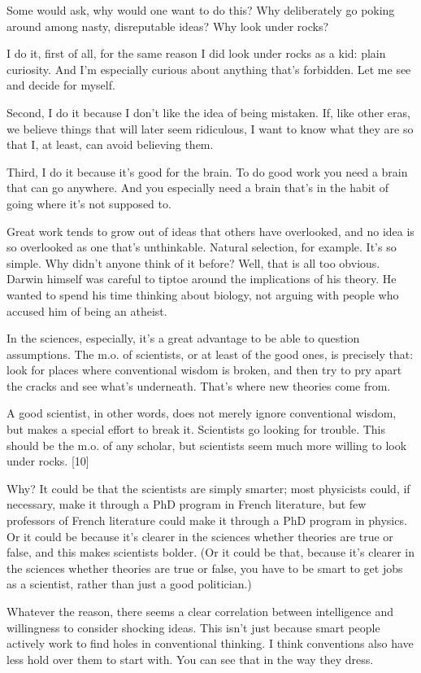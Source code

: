 Some would ask, why would one want to do this? Why deliberately go
poking around among nasty, disreputable ideas? Why look under rocks?

I do it, first of all, for the same reason I did look under rocks as a
kid: plain curiosity. And I'm especially curious about anything that's
forbidden. Let me see and decide for myself.

Second, I do it because I don't like the idea of being mistaken. If,
like other eras, we believe things that will later seem ridiculous, I
want to know what they are so that I, at least, can avoid believing
them.

Third, I do it because it's good for the brain. To do good work you need
a brain that can go anywhere. And you especially need a brain that's in
the habit of going where it's not supposed to.

Great work tends to grow out of ideas that others have overlooked, and
no idea is so overlooked as one that's unthinkable. Natural selection,
for example. It's so simple. Why didn't anyone think of it before? Well,
that is all too obvious. Darwin himself was careful to tiptoe around the
implications of his theory. He wanted to spend his time thinking about
biology, not arguing with people who accused him of being an atheist.

In the sciences, especially, it's a great advantage to be able to
question assumptions. The m.o. of scientists, or at least of the good
ones, is precisely that: look for places where conventional wisdom is
broken, and then try to pry apart the cracks and see what's underneath.
That's where new theories come from.

A good scientist, in other words, does not merely ignore conventional
wisdom, but makes a special effort to break it. Scientists go looking
for trouble. This should be the m.o. of any scholar, but scientists seem
much more willing to look under rocks. {[}10{]}

Why? It could be that the scientists are simply smarter; most physicists
could, if necessary, make it through a PhD program in French literature,
but few professors of French literature could make it through a PhD
program in physics. Or it could be because it's clearer in the sciences
whether theories are true or false, and this makes scientists bolder.
(Or it could be that, because it's clearer in the sciences whether
theories are true or false, you have to be smart to get jobs as a
scientist, rather than just a good politician.)

Whatever the reason, there seems a clear correlation between
intelligence and willingness to consider shocking ideas. This isn't just
because smart people actively work to find holes in conventional
thinking. I think conventions also have less hold over them to start
with. You can see that in the way they dress.

